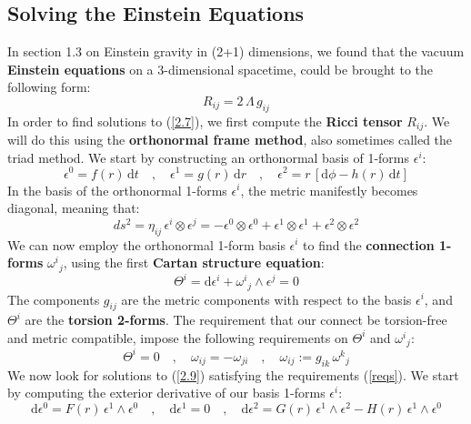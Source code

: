 \subsection{Solving the Einstein Equations}
In section 1.3 on Einstein gravity in (2+1) dimensions, we found that the vacuum \textbf{Einstein equations} on a $3$-dimensional spacetime, could be brought to the following form:
%
%
\begin{equation}\label{2.7}
R_{ij} = 2 \, \Lambda \, g_{ij}
\end{equation}
%
%
In order to find solutions to (\ref{2.7}), we first compute the \textbf{Ricci tensor} $R_{ij}$. We will do this using the \textbf{orthonormal frame method}, also sometimes called the triad method. We start by constructing an orthonormal basis of 1-forms $\epsilon^i$:
%
%
\begin{equation}
\epsilon^0 = f(r) \, \mathrm{d}t
\quad , \quad
\epsilon^1 = g(r) \, \mathrm{d}r
\quad , \quad
\epsilon^2 = r \, [\mathrm{d}\phi
- h(r) \, \mathrm{d}t]
\end{equation}
%
%
In the basis of the orthonormal 1-forms $\epsilon^i$, the metric manifestly becomes diagonal, meaning that:
%
%
\begin{equation}
ds^2 = \eta_{ij} \, \epsilon^i \otimes \epsilon^j
= -\epsilon^0 \otimes \epsilon^0
+ \epsilon^1 \otimes \epsilon^1
+ \epsilon^2 \otimes \epsilon^2
\end{equation}
We can now employ the orthonormal 1-form basis $\epsilon^i$ to find the \textbf{connection 1-forms} ${\omega^i}_j$, using the first \textbf{Cartan structure equation}:
%
%
\begin{equation}\label{2.9}
\Theta^i = \mathrm{d}\epsilon^i + {\omega^i}_j \wedge \epsilon^j = 0
\end{equation}
%
%
The components $g_{ij}$ are the metric components with respect to the basis $\epsilon^i$, and $\Theta^i$ are the \textbf{torsion 2-forms}. The requirement that our connect be torsion-free and metric compatible, impose the following requirements on $\Theta^i$ and ${\omega^i}_j$:
%
%
\begin{equation}\label{reqs}
\Theta^i = 0
\quad , \quad
\omega_{ij} = -\omega_{ji}
\quad , \quad
\omega_{ij} := g_{ik} \, {\omega^k}_j
\end{equation}
%
%
We now look for solutions to (\ref{2.9}) satisfying the requirements (\ref{reqs}). We start by computing the exterior derivative of our basis 1-forms $\epsilon^i$:
\begin{equation}
\mathrm{d}\epsilon^0 = F(r) \, \epsilon^1 \wedge \epsilon^0
\quad , \quad
\mathrm{d}\epsilon^1 = 0
\quad , \quad
\mathrm{d}\epsilon^2 = G(r) \, \epsilon^1 \wedge \epsilon^2
- H(r) \, \epsilon^1 \wedge \epsilon^0
\end{equation}
